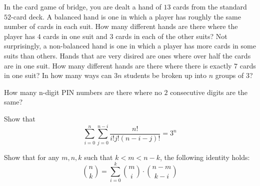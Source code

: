 \documentclass[12pt,oneside]{article}
\begin{document}
\newpage
\begin{problem}{20}
In the card game of bridge, you are dealt a hand of $13$ cards from the standard $52$-card deck.
\bparts
{}
A balanced hand is one in which a player has roughly the same number of cards in each suit. How many different hands are there where the player has $4$ cards in one suit and $3$ cards in each of the other suits?
Not surprisingly, a non-balanced hand is one in which a player has more cards in some suits than others. Hands that are very disired are ones where over half the cards are in one suit. How many different hands are there where there is exactly $7$ cards in one suit?
 In how many ways can $3n$ students be broken up into 
$n$ groups of 3?  

\solution{
\[
\frac{(3n)!}{(3!)^n n!}.
\]
}
How many n-digit PIN numbers are there where no $2$ consecutive digits are the same?
\eparts
\end{problem}

\newpage
\begin{problem}{10}
Show that
\[\sum_{i=0}^n\sum_{j=0}^{n-i}\frac{n!}{i!j!(n-i-j)!} = 3^n\]
\end{problem}

\newpage
\begin{problem}{15}
Show that for any $m,n,k$ such that $k<m<n-k$, the following identity holds:
\[ \binom{n}{k} = \sum_{i=0}^{k} {\binom{m}{i}} \cdot {\binom{n-m}{k-i}}\]
\end{problem}
\end{document}
